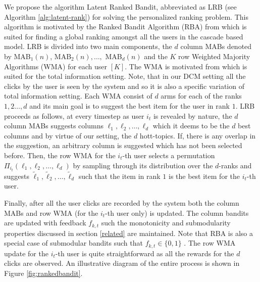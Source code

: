 We propose the algorithm Latent Ranked Bandit, abbreviated as LRB (see Algorithm \ref{alg:latent-rank}) for solving the personalized ranking problem. This algorithm is motivated by the Ranked Bandit Algorithm (RBA) from \citet{radlinski2008learning} which is suited for finding a global ranking amongst all the users in the cascade based model. LRB is divided into two main components, the $d$ column MABs denoted by MAB$_1(n)$, MAB$_2(n), \dots,$ MAB$_d(n)$ and the $K$ row Weighted Majority Algorithms (WMA) for each user $[K]$. The WMA is motivated from \citet{littlestone1994weighted} which is suited for the total information setting. Note, that in our DCM setting all the clicks by the user is seen by the system and so it is also a specific variation of total information setting. Each WMA consist of $d$ arms for each of the ranks $1,2\dots,d$ and its main goal is to suggest the best item for the user in rank $1$.  LRB proceeds as follows, at every timestep as user $i_t$ is revealed by nature, the $d$ column MABs suggests columns ${\ell}_{1}, {\ell}_{2},\dots, {\ell}_{d}$ which it deems to be the $d$ best columns and by virtue of our setting, the $d$ hott-topics. If, there is any overlap in the suggestion, an arbitrary column is suggested which has not been selected before. Then, the row WMA for the $i_t$-th user selects a permutation $\Pi_{i_t}({\ell}_{1}, {\ell}_{2},\dots, {\ell}_{d})$ by sampling through its distribution over the $d$-ranks and suggests $\tilde{\ell}_{1}, \tilde{\ell}_{2},\dots, \tilde{\ell}_{d}$ such that the item in rank $1$ is the best item for the $i_t$-th user. 

Finally, after all the user clicks are recorded by the system both the column MABs and row WMA (for the $i_t$-th user only) is updated. The column bandits are updated with feedback $f_{k,t}$ such the monotonicity and submodularity properties discussed in section \ref{related} are maintained. Note that RBA is also a special case of submodular bandits such that $f_{k,t}\in\lbrace 0, 1\rbrace$ \citep{streeter2009online}. The row WMA update for the $i_t$-th user is quite straightforward as all the rewards for the $d$ clicks are observed. An illustrative diagram of the entire process is shown in Figure \ref{fig:rankedbandit}.



